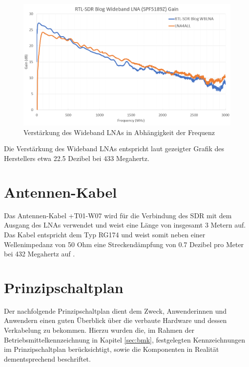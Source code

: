 \begin{figure}[H]
	\centering
	\includegraphics[width=.75\linewidth]{../ref/wideband_lna_gain.png}
	\caption{Verstärkung des Wideband LNAs in Abhängigkeit der Frequenz \cite{noauthor_new_nodate}}
	\label{fig:wideband_lna_gain}
\end{figure}

Die Verstärkung des Wideband LNAs entspricht laut gezeigter Grafik des Herstellers etwa 22.5 Dezibel bei 433 Megahertz.

\section{Antennen-Kabel}
\label{sec:Antennen-Kabel-QFH}
Das Antennen-Kabel +T01-W07 wird für die Verbindung des SDR mit dem Ausgang des LNAs verwendet und weist eine Länge von insgesamt 3 Metern auf. Das Kabel entspricht dem Typ RG174 und weist somit neben einer Wellenimpedanz von 50 Ohm eine Streckendämpfung von 0.7 Dezibel pro Meter bei 432 Megahertz auf \cite{noauthor_dunnes_nodate}.

\section{Prinzipschaltplan}
Der nachfolgende Prinzipschaltplan dient dem Zweck, Anwenderinnen und Anwendern einen guten Überblick über die verbaute Hardware und dessen Verkabelung zu bekommen. Hierzu wurden die, im Rahmen der Betriebsmittelkennzeichnung in Kapitel \ref{sec:bmk}, festgelegten Kennzeichnungen im Prinzipschaltplan berücksichtigt, sowie die Komponenten in Realität dementsprechend beschriftet.

